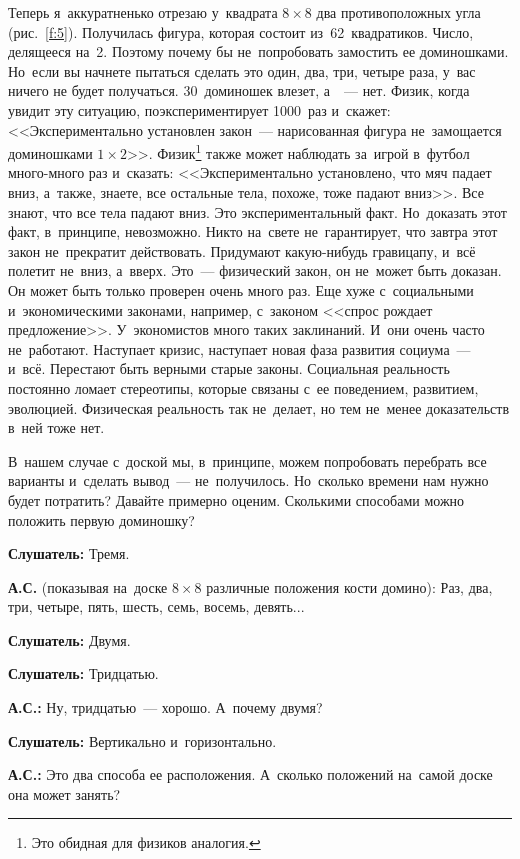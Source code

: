 Теперь я~аккуратненько отрезаю у~квадрата $8\times8$ два противоположных угла (рис.~\ref{f:5}). Получилась фигура,
которая состоит из~62~квадратиков. Число, делящееся на~2. Поэтому почему бы не~попробовать
замостить ее доминошками. Но~если вы начнете пытаться сделать это один, два, три, четыре раза,
у~вас ничего не будет получаться.
 30~доминошек влезет, а~~--- нет. Физик, когда увидит эту ситуацию,
поэкспериментирует 1000~раз и~скажет: <<Экспериментально установлен закон~--- нарисованная фигура
не~замощается доминошками $1\times2$>>. Физик\footnote{Это обидная для физиков аналогия.} также может наблюдать за~игрой в~футбол много-много раз
и~сказать: <<Экспериментально установлено, что мяч падает вниз, а~также, знаете, все остальные тела,
похоже, тоже падают вниз>>. Все знают, что все тела падают вниз. Это экспериментальный факт.
Но~доказать этот факт, в~принципе, невозможно. Никто на~свете не~гарантирует, что завтра этот закон
не~прекратит действовать. Придумают какую-нибудь гравицапу, и~всё полетит не~вниз, а~вверх. Это~---
физический закон, он не~может быть доказан. Он может быть только проверен очень много раз. Еще хуже
с~социальными и~экономическими законами, например, с~законом <<спрос рождает предложение>>.
У~экономистов много таких заклинаний. И~они очень часто не~работают. Наступает кризис, наступает
новая фаза развития социума~--- и~всё.
 Перестают быть верными старые законы. Социальная
реальность постоянно ломает стереотипы, которые связаны с~ее поведением, развитием, эволюцией.
Физическая реальность так не~делает, но тем не~менее доказательств в~ней тоже нет.

В~нашем случае с~доской мы, в~принципе, можем попробовать перебрать все варианты и~сделать
вывод~--- не~получилось. Но~сколько времени нам нужно будет потратить? Давайте примерно оценим.
Сколькими способами можно положить первую доминошку?

\textbf{Слушатель:} Тремя.

\textbf{А.С.} (показывая на~доске $8\times8$ различные положения кости домино):
Раз, два, три, четыре, пять, шесть, семь, восемь, девять...

\textbf{Слушатель:} Двумя.

\textbf{Слушатель:} Тридцатью.

\textbf{А.С.:} Ну, тридцатью~--- хорошо. А~почему двумя?

\textbf{Слушатель:} Вертикально и~горизонтально.

\textbf{А.С.:} Это два способа ее расположения. А~сколько положений на~самой доске она может занять?


